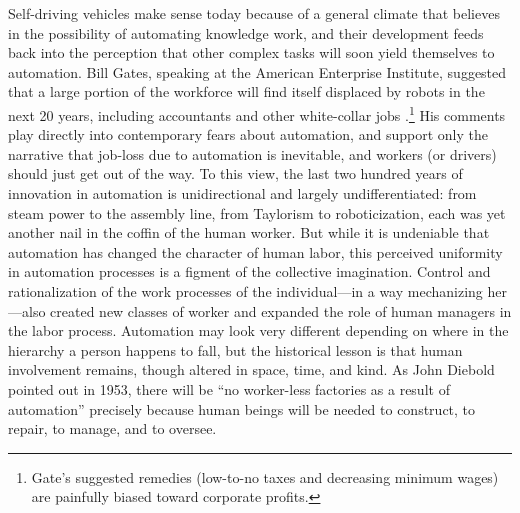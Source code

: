 Self-driving vehicles make sense today because of
a general climate that believes in the possibility of automating
knowledge work, and their development feeds back into the perception
that other complex tasks will soon yield themselves to automation. Bill
Gates, speaking at the American Enterprise Institute,
suggested that a large portion of the workforce will find itself
displaced by robots in the next 20 years, including accountants and
other white-collar
jobs \cite{gatesRobots}.\footnote{Gate's suggested remedies (low-to-no taxes and decreasing minimum
wages) are painfully biased toward corporate profits.}
His comments play directly into
contemporary fears about automation, and support only the
narrative that job-loss due to automation is inevitable, and workers
(or drivers)
should just get out of the way. To this view, the last two hundred
years of innovation in automation is unidirectional and largely
undifferentiated:  from steam power to the assembly line, from
Taylorism to roboticization, each was yet another nail in the coffin
of the human worker. But
while it is undeniable that automation has changed the
character of human labor, this perceived uniformity in automation
processes is a figment of the collective imagination. Control and
rationalization of
the work processes of the individual---in a way mechanizing her---also
created new classes of worker and expanded the role of human managers
in the labor process. Automation may look very
different depending on where in the hierarchy 
a person happens to fall, but the historical lesson is that human
involvement remains, though altered in space, time, and kind. As John
Diebold pointed out in 1953, there will be ``no worker-less
factories as a result of automation'' \cite[p. 63-64]{dieboldNew}
precisely because human beings will be needed to construct, to repair,
to manage, and to oversee.






